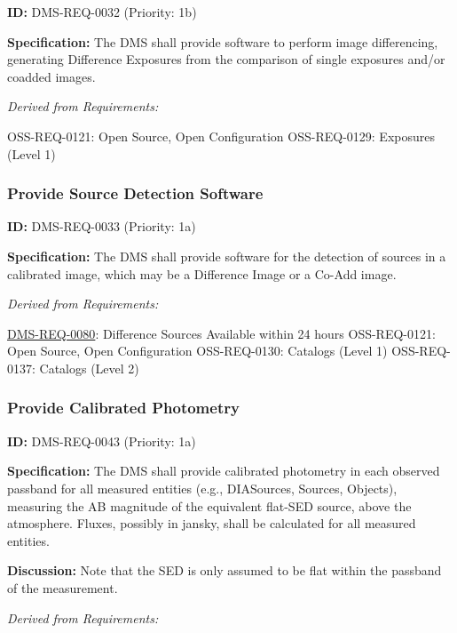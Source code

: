 \documentclass[SE,toc,lsstdraft]{lsstdoc}
\begin{document}
\label{DMS-REQ-0032}
\textbf{ID:} DMS-REQ-0032 (Priority: 1b)

\textbf{Specification:} The DMS shall provide software to perform image differencing, generating Difference Exposures from the comparison of single exposures and/or coadded images.

\emph{Derived from Requirements:}

OSS-REQ-0121:
Open Source, Open Configuration \newline
OSS-REQ-0129:
Exposures (Level 1) \newline

\subsubsection{Provide Source Detection Software}

\label{DMS-REQ-0033}
\textbf{ID:} DMS-REQ-0033 (Priority: 1a)

\textbf{Specification:} The DMS shall provide software for the detection of sources in a calibrated image, which may be a Difference Image or a Co-Add image.

\emph{Derived from Requirements:}

\hyperref[DMS-REQ-0080]{DMS-REQ-0080}:
Difference Sources Available within 24 hours \newline
OSS-REQ-0121:
Open Source, Open Configuration \newline
OSS-REQ-0130:
Catalogs (Level 1) \newline
OSS-REQ-0137:
Catalogs (Level 2) \newline

\subsubsection{Provide Calibrated Photometry}

\label{DMS-REQ-0043}
\textbf{ID:} DMS-REQ-0043 (Priority: 1a)

\textbf{Specification:} The DMS shall provide calibrated photometry in each observed passband for all measured entities (e.g., DIASources, Sources, Objects), measuring the AB magnitude of the equivalent flat-SED source, above the atmosphere. Fluxes, possibly in jansky, shall be calculated for all measured entities.

\textbf{Discussion: }Note that the SED is only assumed to be flat within the passband of the measurement.

\emph{Derived from Requirements:}
\end{document}
